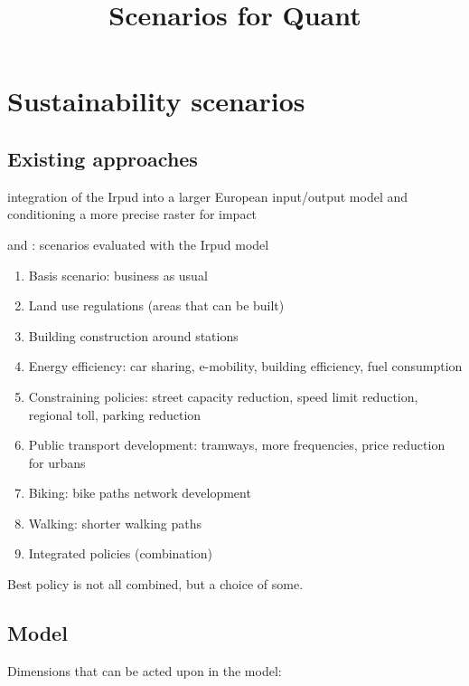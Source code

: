 \documentclass[10pt]{article}
\title{Scenarios for Quant}
\begin{document}
\maketitle


\section{Sustainability scenarios}

\subsection{Existing approaches}


\cite{spiekermann2018multi} integration of the Irpud into a larger European input/output model and conditioning a more precise raster for impact 



\cite{reutter2018verkehr} and \cite{schwarze2017stadte}: scenarios evaluated with the Irpud model
\begin{enumerate}
	\item Basis scenario: business as usual
	\item Land use regulations (areas that can be built)
	\item Building construction around stations
	\item Energy efficiency: car sharing, e-mobility, building efficiency, fuel consumption
	\item Constraining policies: street capacity reduction, speed limit reduction, regional toll, parking reduction
	\item Public transport development: tramways, more frequencies, price reduction for urbans
	\item Biking: bike paths network development
	\item Walking: shorter walking paths
	\item Integrated policies (combination)
\end{enumerate}

Best policy is not all combined, but a choice of some.



\subsection{Model}

Dimensions that can be acted upon in the model:
\end{document}

